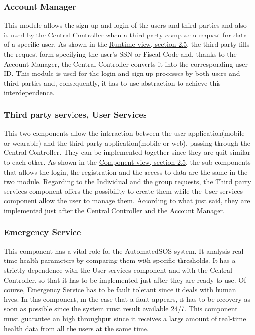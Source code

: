 \subsubsection{Account Manager}
This module allows the sign-up and login of the users and third parties and also is used by the Central Controller when a third party compose a request for data of a specific user. As shown in the \hyperlink{RV}{\underline{Runtime view, section 2.5}}, the third party fills the request form specifying the user's SSN or Fiscal Code and, thanks to the Account Manager, the Central Controller converts it into the corresponding user ID.
This module is used for the login and sign-up processes by both users and third parties and, consequently, it has to use abstraction to achieve this interdependence.

\subsubsection{Third party services, User Services}
This two components allow the interaction between the user application(mobile or wearable) and the third party application(mobile or web), passing through the Central Controller.
They can be implemented together since they are quit similar to each other.
As shown in the \hyperlink{CV}{\underline{Component view, section 2.5}}, the sub-components that allows the login, the registration and the access to data are the same in the two module. 
Regarding to the Individual and the group requests, the Third party services component offers the possibility to create them while the User services component allow the user to manage them.
According to what just said, they are implemented just after the Central Controller and the Account Manager.

\subsubsection{Emergency Service}
This component has a vital role for the AutomatedSOS system. It analysis real-time health parameters by comparing them with specific thresholds. It has a strictly dependence with the User services component and with the Central Controller, so that it has to be implemented just after they are ready to use.
Of course, Emergency Service has to be fault tolerant since it deals with human lives. In this component, in the case that a fault appears, it has to be recovery as soon as possible since the system must result available 24/7. 
This component must guarantee an high throughput since it receives a large amount of real-time health data from all the users at the same time.


